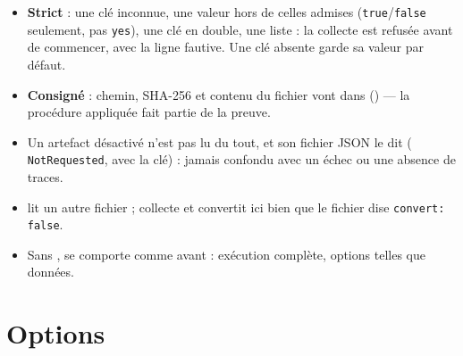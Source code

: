 \documentclass[11pt,a4paper,oneside]{report}
\begin{document}
\begin{itemize}
  \item \textbf{Strict} : une clé inconnue, une valeur hors de celles admises
    (\texttt{true}/\texttt{false} seulement, pas \texttt{yes}), une clé en
    double, une liste : la collecte est refusée avant de commencer, avec la
    ligne fautive. Une clé absente garde sa valeur par défaut.
  \item \textbf{Consigné} : chemin, SHA-256 et contenu du fichier vont dans
     () — la procédure
    appliquée fait partie de la preuve.
  \item Un artefact désactivé n'est pas lu du tout, et son fichier JSON le dit
    ( \texttt{NotRequested}, avec la clé) : jamais
    confondu avec un échec ou une absence de traces.
  \item {} lit un autre fichier ;  collecte et
    convertit ici bien que le fichier dise \texttt{convert: false}.
  \item Sans , \wac{} se comporte comme avant : exécution
    complète, options telles que données.
\end{itemize}

\section{Options}
\end{document}
